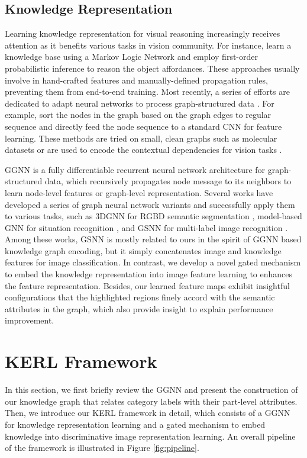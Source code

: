 \documentclass{article}
\begin{document}
\subsection{Knowledge Representation}
Learning knowledge representation for visual reasoning increasingly receives attention as it benefits various tasks \cite{malisiewicz2009beyond,lao2011random,zhu2014reasoning,lin2017knowledge} in vision community. For instance, \cite{zhu2014reasoning} learn a knowledge base using a Markov Logic Network and employ first-order probabilistic inference to reason the object affordances. These approaches usually involve in hand-crafted features and manually-defined propagation rules, preventing them from end-to-end training. Most recently, a series of efforts are dedicated to adapt neural networks to process graph-structured data \cite{duvenaud2015convolutional,niepert2016learning}. For example, \cite{niepert2016learning} sort the nodes in the graph based on the graph edges to regular sequence and directly feed the node sequence to a standard CNN for feature learning. These methods are tried on small, clean graphs such as molecular datasets \cite{duvenaud2015convolutional} or are used to encode the contextual dependencies for vision tasks \cite{liang2016semantic}.

GGNN \cite{li2015gated} is a fully differentiable recurrent neural network architecture for graph-structured data, which recursively propagates node message to its neighbors to learn node-level features or graph-level representation. Several works have developed a series of graph neural network variants and successfully apply them to various tasks, such as 3DGNN for RGBD semantic segmentation \cite{qi20173d}, model-based GNN for situation recognition \cite{li2017situation}, and GSNN for multi-label image recognition \cite{marino2017more}. Among these works, GSNN \cite{marino2017more} is mostly related to ours in the spirit of GGNN based knowledge graph encoding, but it simply concatenates image and knowledge features for image classification. In contrast, we develop a novel gated mechanism to embed the knowledge representation into image feature learning to enhances the feature representation. Besides, our learned feature maps exhibit insightful configurations that the highlighted regions finely accord with the semantic attributes in the graph, which also provide insight to explain performance improvement.

\section{KERL Framework}
In this section, we first briefly review the GGNN and present the construction of our knowledge graph that relates category labels with their part-level attributes. Then, we introduce our KERL framework in detail, which consists of a GGNN for knowledge representation learning and a gated mechanism to embed knowledge into discriminative image representation learning. An overall pipeline of the framework is illustrated in Figure \ref{fig:pipeline}. 
\end{document}
